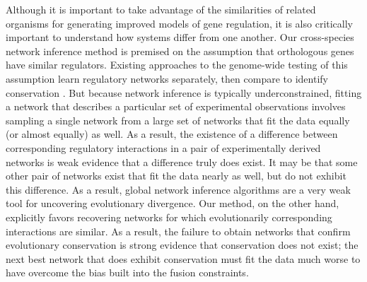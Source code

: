 \documentclass[11pt]{article}
\begin{document}
Although it is important to take advantage of the similarities of related organisms for generating improved models of gene regulation, it is also critically important to understand how systems differ from one another. Our cross-species network inference method is premised on the assumption that orthologous genes have similar regulators. Existing approaches to the genome-wide testing of this assumption learn regulatory networks separately, then compare to identify conservation \cite{aytes_cross-species_2014, Wang2014a}. But because network inference is typically underconstrained, fitting a network that describes a particular set of experimental observations involves sampling a single network from a large set of networks that fit the data equally (or almost equally) as well. As a result, the existence of a difference between corresponding regulatory interactions in a pair of experimentally derived networks is weak evidence that a difference truly does exist. It may be that some other pair of networks exist that fit the data nearly as well, but do not exhibit this difference. As a result, global network inference algorithms are a very weak tool for uncovering evolutionary divergence. Our method, on the other hand, explicitly favors recovering networks for which evolutionarily corresponding interactions are similar. As a result, the failure to obtain networks that confirm evolutionary conservation is strong evidence that conservation does not exist; the next best network that does exhibit conservation must fit the data much worse to have overcome the bias built into the fusion constraints. 
\end{document}

